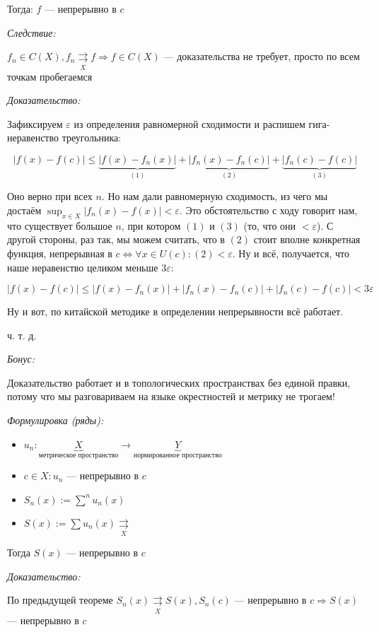\documentclass{article}
\def\rsh#1{\underset{#1}{\rightrightarrows}}
\begin{document}
Тогда: $f$ --- непрерывно в $c$

\textit{Следствие:}

$f_n \in C(X), f_n \rsh{X} f \Rightarrow f \in C(X)$ --- доказательства не требует, просто по всем точкам пробегаемся

\textit{Доказательство:}

Зафиксируем $\varepsilon$ из определения равномерной сходимости и распишем гига-неравенство треугольника:

\[|f(x) - f(c)| \le \underbrace{|f(x) - f_n(x)|}_{(1)} + \underbrace{|f_n(x) - f_n(c)|}_{(2)} + \underbrace{|f_n(c) - f(c)|}_{(3)}\]

Оно верно при всех $n$. Но нам дали равномерную сходимость, из чего мы достаём $\sup_{x \in X} |f_n(x) - f(x)| < \varepsilon$. Это обстоятельство с ходу говорит нам, что существует большое $n$, при котором $(1)$ и $(3)$ (то, что они $< \varepsilon$). С другой стороны, раз так, мы можем считать, что в $(2)$ стоит вполне конкретная функция, непрерывная в $c \Leftrightarrow \forall x \in U(c): (2) < \varepsilon$. Ну и всё, получается, что наше неравенство целиком меньше $3 \varepsilon$:

\[|f(x) - f(c)| \le |f(x) - f_n(x)| + |f_n(x) - f_n(c)| + |f_n(c) - f(c)| < 3\varepsilon\]

Ну и вот, по китайской методике в определении непрерывности всё работает.

ч. т. д.

\textit{Бонус:}

\Smiley 

Доказательство работает и в топологических пространствах без единой правки, потому что мы разговариваем на языке окрестностей и метрику не трогаем!

\textit{Формулировка (ряды):}

\begin{itemize}
    \item $u_n: \underbrace{X}_{\text{метрическое пространство}} \rightarrow \underbrace{Y}_{\text{нормированное пространство}}$
    \item $c \in X: u_n$ --- непрерывно в $c$ 
    \item $S_n(x) := \sum^n u_n(x)$
    \item $S(x) := \sum u_n(x) \rsh{X}$
\end{itemize}

Тогда $S(x)$ --- непрерывно в $c$

\textit{Доказательство:}

По предыдущей теореме $S_n(x) \rsh{X} S(x), S_n(c)$ --- непрерывно в $c \Rightarrow S(x)$ --- непрерывно в $c$
\end{document}
